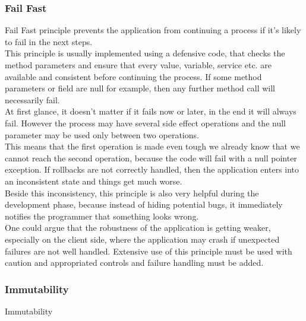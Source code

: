 \subsubsection{Fail Fast}
Fail Fast principle prevents the application from continuing a process if
it's likely to fail in the next steps. \\
\newline
This principle is usually implemented using a defensive code, that checks
the method parameters and ensure that every value, variable, service etc.
are available and consistent before continuing the process.
If some method parameters or field are null for example, then any further
method call will necessarily fail. \\
\newline
At first glance, it doesn't matter if it fails now or later, in the end
it will always fail.
However the process may have several side effect operations and the null
parameter may be used only between two operations. \\
This means that the first operation is made even tough we already know
that we cannot reach the second operation, because the code will fail
with a null pointer exception.
If rollbacks are not correctly handled, then the application enters into
an inconsistent state and things get much worse. \\
\newline
Beside this inconsistency, this principle is also very helpful during
the development phase, because instead of hiding potential bugs, it
immediately notifies the programmer that something looks wrong. \\
One could argue that the robustness of the application is getting weaker,
especially on the client side, where the application may crash if
unexpected failures are not well handled.
Extensive use of this principle must be used with caution and
appropriated controls and failure handling must be added.

\subsubsection{Immutability}
Immutability

